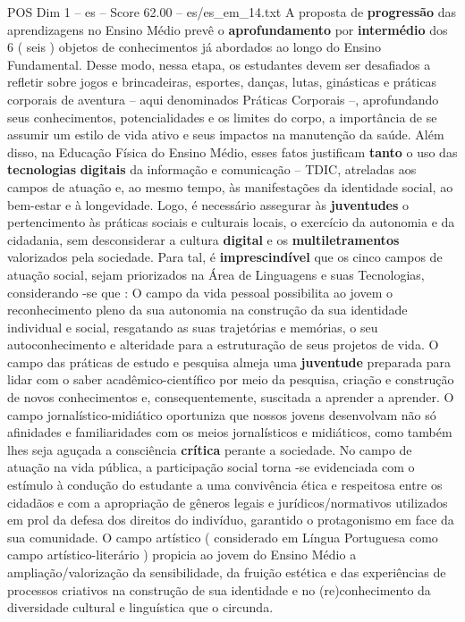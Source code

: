 \begin{textsample}{POS Dim 1 – es – Score 62.00 – es/es\_em\_14.txt}
A proposta de \textbf{progressão} das aprendizagens no Ensino Médio prevê o \textbf{aprofundamento} por \textbf{intermédio} dos 6 ( seis ) objetos de conhecimentos já abordados ao longo do Ensino Fundamental.
Desse modo, nessa etapa, os estudantes devem ser desafiados a refletir sobre jogos e brincadeiras, esportes, danças, lutas, ginásticas e práticas corporais de aventura – aqui denominados Práticas Corporais –, aprofundando seus conhecimentos, potencialidades e os limites do corpo, a importância de se assumir um estilo de vida ativo e seus impactos na manutenção da saúde.
Além disso, na Educação Física do Ensino Médio, esses fatos justificam \textbf{tanto} o uso das \textbf{tecnologias} \textbf{digitais} da informação e comunicação – TDIC, atreladas aos campos de atuação e, ao mesmo tempo, às manifestações da identidade social, ao bem-estar e à longevidade.
Logo, é necessário assegurar às \textbf{juventudes} o pertencimento às práticas sociais e culturais locais, o exercício da autonomia e da cidadania, sem desconsiderar a cultura \textbf{digital} e os \textbf{multiletramentos} valorizados pela sociedade.
Para tal, é \textbf{imprescindível} que os cinco campos de atuação social, sejam priorizados na Área de Linguagens e suas Tecnologias, considerando -se que : O campo da vida pessoal possibilita ao jovem o reconhecimento pleno da sua autonomia na construção da sua identidade individual e social, resgatando as suas trajetórias e memórias, o seu autoconhecimento e alteridade para a estruturação de seus projetos de vida.
O campo das práticas de estudo e pesquisa almeja uma \textbf{juventude} preparada para lidar com o saber acadêmico-científico por meio da pesquisa, criação e construção de novos conhecimentos e, consequentemente, suscitada a aprender a aprender.
O campo jornalístico-midiático oportuniza que nossos jovens desenvolvam não só afinidades e familiaridades com os meios jornalísticos e midiáticos, como também lhes seja aguçada a consciência \textbf{crítica} perante a sociedade.
No campo de atuação na vida pública, a participação social torna -se evidenciada com o estímulo à condução do estudante a uma convivência ética e respeitosa entre os cidadãos e com a apropriação de gêneros legais e jurídicos/normativos utilizados em prol da defesa dos direitos do indivíduo, garantido o protagonismo em face da sua comunidade.
O campo artístico ( considerado em Língua Portuguesa como campo artístico-literário ) propicia ao jovem do Ensino Médio a ampliação/valorização da sensibilidade, da fruição estética e das experiências de processos criativos na construção de sua identidade e no (re)conhecimento da diversidade cultural e linguística que o circunda.

\end{textsample}
